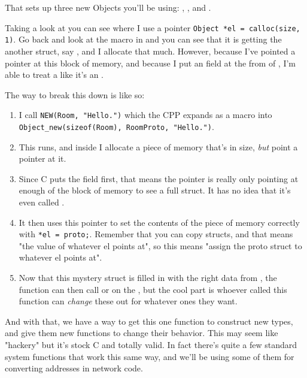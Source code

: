 That sets up three new Objects you'll be using: , ,
and .

Taking a look at  you can see where I use a pointer
\verb|Object *el = calloc(size, 1)|.  Go back and look at the 
macro in  and you can see that it is getting the 
another struct, say , and I allocate that much.  However, because
I've pointed a  pointer at this block of memory, and because
I put an  field at the from of , I'm able
to treat a  like it's an .

The way to break this down is like so:

\begin{enumerate}
\item I call \verb|NEW(Room, "Hello.")| which the CPP expands as a macro
    into \verb|Object_new(sizeof(Room), RoomProto, "Hello.")|.
\item This runs, and inside  I allocate a piece of memory
    that's  in size, \emph{but} point a  pointer
    at it.
\item Since C puts the  field first, that means the 
    pointer is really only pointing at enough of the block of memory to
    see a full  struct.  It has no idea that it's even called
    .
\item It then uses this  pointer to set the contents of
    the piece of memory correctly with \verb|*el = proto;|.  Remember that
    you can copy structs, and that  means "the value of whatever el points
    at", so this means "assign the proto struct to whatever el points at".
\item Now that this mystery struct is filled in with the right data from
    , the function can then call  or 
    on the , but the cool part is whoever called this function
    can \emph{change} these out for whatever ones they want.
\end{enumerate}

And with that, we have a way to get this one function to construct new types,
and give them new functions to change their behavior.  This may seem like
"hackery" but it's stock C and totally valid.  In fact there's quite a few
standard system functions that work this same way, and we'll be using some of
them for converting addresses in network code.


